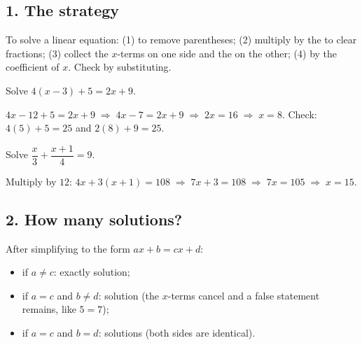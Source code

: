 \newcommand{\gr}[2]{\begin{center}\begin{tikzpicture}\begin{axis}[gridaxis,#1]#2\end{axis}\end{tikzpicture}\end{center}}
\newcommand{\pt}[1]{\node[circle,fill=apblue,inner sep=1.5pt] at (axis cs:#1){};}


\subsection*{1. The strategy}
\begin{keyidea}
To solve a linear equation: (1)  to remove parentheses; (2) multiply by the  to clear fractions; (3) collect the $x$-terms on one side and the  on the other; (4)  by the coefficient of $x$. Check by substituting.
\end{keyidea}

Solve $4(x-3)+5=2x+9$.
\begin{workspace}[2.4cm]
$4x-12+5=2x+9 \;\Rightarrow\; 4x-7=2x+9 \;\Rightarrow\; 2x=16 \;\Rightarrow\; x=8$. Check: $4(5)+5=25$ and $2(8)+9=25$.
\end{workspace}

Solve $\dfrac{x}{3}+\dfrac{x+1}{4}=9$.
\begin{workspace}[2.4cm]
Multiply by $12$: $4x+3(x+1)=108 \;\Rightarrow\; 7x+3=108 \;\Rightarrow\; 7x=105 \;\Rightarrow\; x=15$.
\end{workspace}

\subsection*{2. How many solutions?}
\begin{keyidea}
After simplifying to the form $ax+b=cx+d$:
\begin{itemize}
\item if $a\neq c$: exactly  solution;
\item if $a=c$ and $b\neq d$:  solution (the $x$-terms cancel and a false statement remains, like $5=7$);
\item if $a=c$ and $b=d$:  solutions (both sides are identical).
\end{itemize}
\end{keyidea}

